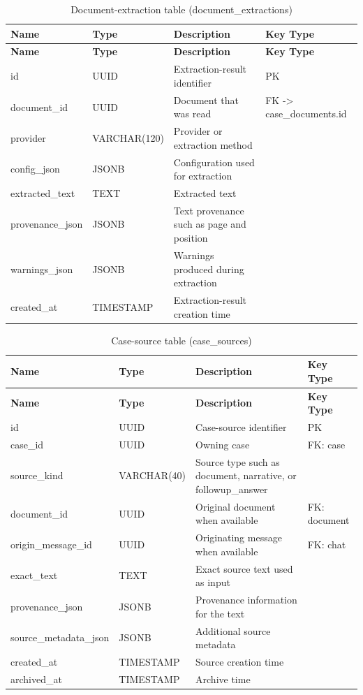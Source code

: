 \begin{longtable}{@{}>{\raggedright\arraybackslash}p{} >{\raggedright\arraybackslash}p{} >{\raggedright\arraybackslash}p{} >{\raggedright\arraybackslash}p{}@{}}
\caption{Document-extraction table (document\_extractions)}\label{tab:3-12}\\
\toprule
\textbf{Name} & \textbf{Type} & \textbf{Description} & \textbf{Key Type} \\
\midrule
\endfirsthead
\textbf{Name} & \textbf{Type} & \textbf{Description} & \textbf{Key Type} \\
\midrule
\endhead
id & UUID & Extraction-result identifier & PK \\
document\_id & UUID & Document that was read & FK -> case\_documents.id \\
provider & VARCHAR(120) & Provider or extraction method &  \\
config\_json & JSONB & Configuration used for extraction &  \\
extracted\_text & TEXT & Extracted text &  \\
provenance\_json & JSONB & Text provenance such as page and position &  \\
warnings\_json & JSONB & Warnings produced during extraction &  \\
created\_at & TIMESTAMP & Extraction-result creation time &  \\
\bottomrule
\end{longtable}

\begin{longtable}{@{}>{\raggedright\arraybackslash}p{} >{\raggedright\arraybackslash}p{} >{\raggedright\arraybackslash}p{} >{\raggedright\arraybackslash}p{}@{}}
\caption{Case-source table (case\_sources)}\label{tab:3-13}\\
\toprule
\textbf{Name} & \textbf{Type} & \textbf{Description} & \textbf{Key Type} \\
\midrule
\endfirsthead
\textbf{Name} & \textbf{Type} & \textbf{Description} & \textbf{Key Type} \\
\midrule
\endhead
id & UUID & Case-source identifier & PK \\
case\_id & UUID & Owning case & FK: case \\
source\_kind & VARCHAR(40) & Source type such as document, narrative, or followup\_answer &  \\
document\_id & UUID & Original document when available & FK: document \\
origin\_message\_id & UUID & Originating message when available & FK: chat \\
exact\_text & TEXT & Exact source text used as input &  \\
provenance\_json & JSONB & Provenance information for the text &  \\
source\_metadata\_json & JSONB & Additional source metadata &  \\
created\_at & TIMESTAMP & Source creation time &  \\
archived\_at & TIMESTAMP & Archive time &  \\
\bottomrule
\end{longtable}

